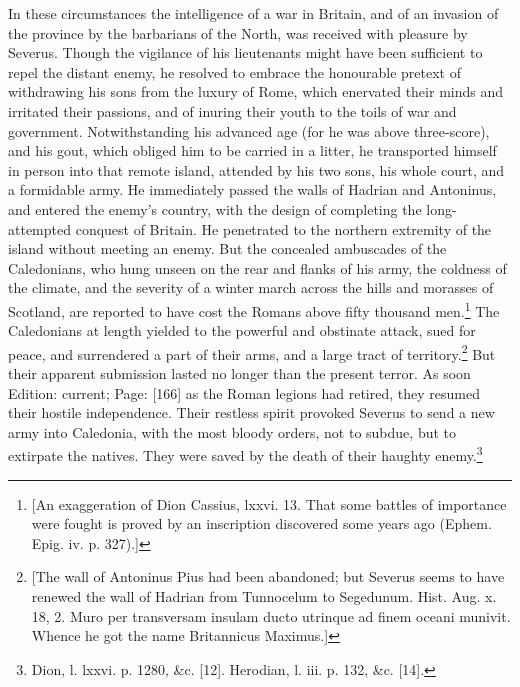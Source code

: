 In these circumstances the intelligence of a war in Britain, and of an invasion of the province by the barbarians of the North, was received with pleasure by Severus. Though the vigilance of his lieutenants might have been sufficient to repel the distant enemy, he resolved to embrace the honourable pretext of withdrawing his sons from the luxury of Rome, which enervated their minds and irritated their passions, and of inuring their youth to the toils of war and government. Notwithstanding his advanced age (for he was above three-score), and his gout, which obliged him to be carried in a litter, he transported himself in person into that remote island, attended by his two sons, his whole court, and a formidable army. He immediately passed the walls of Hadrian and Antoninus, and entered the enemy\texthebrew{}’s country, with the design of completing the long-attempted conquest of Britain. He penetrated to the northern extremity of the island without meeting an enemy. But the concealed ambuscades of the Caledonians, who hung unseen on the rear and flanks of his army, the coldness of the climate, and the severity of a winter march across the hills and morasses of Scotland, are reported to have cost the Romans above fifty thousand men.\footnote{[An exaggeration of Dion Cassius, lxxvi. 13. That some battles of importance were fought is proved by an inscription discovered some years ago (Ephem. Epig. iv. p. 327).]} The Caledonians at length yielded to the powerful and obstinate attack, sued for peace, and surrendered a part of their arms, and a large tract of territory.\footnote{[The wall of Antoninus Pius had been abandoned; but Severus seems to have renewed the wall of Hadrian from Tunnocelum to Segedunum. Hist. Aug. x. 18, 2. Muro per transversam insulam ducto utrinque ad finem oceani munivit. Whence he got the name Britannicus Maximus.]} But their apparent submission lasted no longer than the present terror. As soon Edition: current; Page: [166] as the Roman legions had retired, they resumed their hostile independence. Their restless spirit provoked Severus to send a new army into Caledonia, with the most bloody orders, not to subdue, but to extirpate the natives. They were saved by the death of their haughty enemy.\footnote{Dion, l. lxxvi. p. 1280, \&c. [12]. Herodian, l. iii. p. 132, \&c. [14].}

